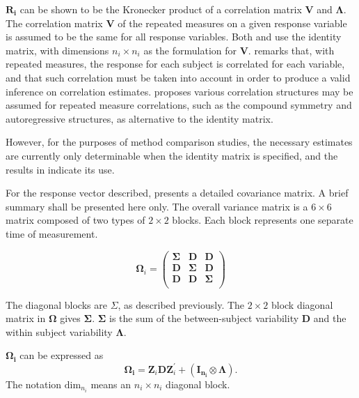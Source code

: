 \documentclass[12pt, a4paper]{report}
\theoremstyle{plain}
\theoremstyle{definition}
\theoremstyle{remark}
\begin{document}
	$\boldsymbol{R_{i}}$ can be shown to be the Kronecker product of a correlation matrix $\boldsymbol{V}$ and $\boldsymbol{\Lambda}$. The correlation matrix $\boldsymbol{V}$ of the repeated measures on a given response variable is assumed to be the same for all response variables. Both \citet{hamlett} and \citet{lam} use the identity matrix, with dimensions $n_{i} \times n_{i}$ as the formulation for $\boldsymbol{V}$. \citet{ARoy2009} remarks that, with repeated measures, the response for each subject is correlated for each variable, and that such correlation must be taken into account in order to produce a valid inference on correlation estimates.  \citet{ARoy20092006} proposes various correlation structures may be assumed for repeated measure correlations, such as the compound symmetry and autoregressive structures, as alternative to the identity matrix.
	
	However, for the purposes of method comparison studies, the necessary estimates are currently only determinable when the identity matrix is specified, and the results in \citet{ARoy2009} indicate its use.
	
	For the response vector described, \citet{hamlett} presents a detailed covariance matrix. A brief summary shall be presented here only. The overall variance matrix is a $6 \times 6$ matrix composed of two types of $2 \times 2$ blocks. Each block represents one separate time of measurement.
	
	\[
	\boldsymbol{\Omega}_{i} = \left(
	\begin{array}{ccc}
	\boldsymbol{\Sigma} & \boldsymbol{D} & \boldsymbol{D}\\
	\boldsymbol{D} & \boldsymbol{\Sigma} & \boldsymbol{D}\\
	\boldsymbol{D} & \boldsymbol{D} & \boldsymbol{\Sigma}\\
	\end{array}\right)
	\]
	
	The diagonal blocks are $\Sigma$, as described previously. The $2 \times 2$ block diagonal matrix in $\boldsymbol{\Omega}$ gives $\boldsymbol{\Sigma}$. $\boldsymbol{\Sigma}$ is the sum of the between-subject variability $\boldsymbol{D}$ and the within subject variability $\boldsymbol{\Lambda}$.
	
	$\boldsymbol{\Omega_{i}}$ can be expressed as
	\[
	\boldsymbol{\Omega_{i}} = \boldsymbol{Z}_{i}\boldsymbol{D}\boldsymbol{Z}_{i}^\prime + ({\boldsymbol{I_{n_{i}}} \otimes \boldsymbol{\Lambda}}).
	\]
	The notation $\mbox{dim}_{n_{i}}$ means an $n_{i} \times n_{i}$ diagonal block.
	
\end{document}
